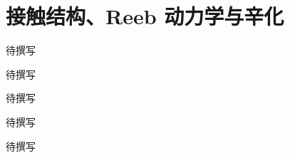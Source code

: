 
% 
% 

\chapter{接触结构、Reeb 动力学与辛化}
\label{g4:ch:13}

\begin{chapterabstract}
待撰写
\end{chapterabstract}

\begin{learninggoals}
待撰写
\end{learninggoals}

待撰写






\begin{chaptersummary}
待撰写
\end{chaptersummary}

\BookExercises
待撰写
